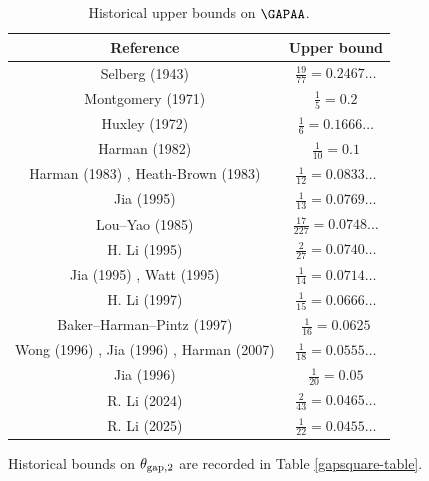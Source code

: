\begin{table}[ht]
    \caption{Historical upper bounds on $\GAPAA$.}
    \label{gapaa-table}
    \centering
    \renewcommand{\arraystretch}{1.2}
    \begin{tabular}{|c|c|}
    \hline
    Reference & Upper bound \\
    \hline
    Selberg (1943) \cite{selberg_1943} & $\frac{19}{77}=0.2467\dots$\\
    \hline
    Montgomery (1971) \cite{montgomery_topics_1971} & $\frac{1}{5}=0.2$ \\
    \hline
    Huxley (1972) \cite{Huxley} & $\frac{1}{6} = 0.1666\dots$ \\
    \hline
    Harman (1982) \cite{harman_1982} & $\frac{1}{10} = 0.1$ \\
    \hline
    Harman (1983) \cite{harman_1983}, Heath-Brown (1983) \cite{heathbrown_sieve_1984}  & $\frac{1}{12} = 0.0833\dots$ \\
    \hline
    Jia (1995) \cite{jia_goldbach_1994} & $\frac{1}{13} = 0.0769\dots$ \\
    \hline
    Lou--Yao (1985) \cite{lou_yao_1985} & $\frac{17}{227}= 0.0748\dots$ \\
    \hline
    H. Li (1995) \cite{li_goldbach_1995} & $\frac{2}{27} = 0.0740\dots$ \\
    \hline
    Jia (1995) \cite{jia_difference_1995}, Watt (1995) \cite{watt_short_1995} & $\frac{1}{14}=0.0714\dots$ \\
    \hline
    H. Li (1997) \cite{li_short_1997} & $\frac{1}{15}=0.0666\dots$ \\
    \hline
    Baker--Harman--Pintz (1997) \cite{baker-harman-pintz_goldbach_1997} & $\frac{1}{16} = 0.0625$ \\
    \hline
    Wong (1996) \cite{wong_thesis_1996}, Jia (1996) \cite{jia_exceptional_1996}, Harman (2007) \cite{harman-book} & $\frac{1}{18} = 0.0555\dots$ \\
    \hline
    Jia (1996) \cite{jia_almost_all} & $\frac{1}{20} = 0.05$ \\
    \hline
    R. Li (2024) \cite{li_primes_almost_2024} & $\frac{2}{43} = 0.0465\dots$ \\
    \hline
    R. Li (2025) \cite{li_primes_almost_II_2025} & $\frac{1}{22} = 0.0455\dots$ \\
    \hline
    \end{tabular}
    \end{table}

    Historical bounds on $\theta_{\mathrm{gap},2}$ are recorded in Table \ref{gapsquare-table}.

